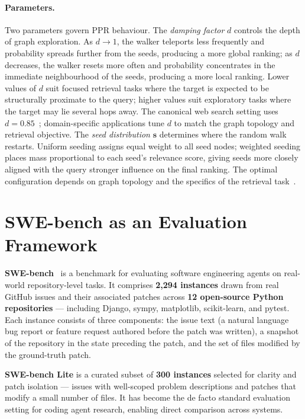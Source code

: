 \paragraph{Parameters.}
Two parameters govern PPR behaviour.
The \emph{damping factor} $d$ controls the depth of graph exploration.
As $d \to 1$, the walker teleports less frequently and probability spreads further from
the seeds, producing a more global ranking; as $d$ decreases, the walker resets more
often and probability concentrates in the immediate neighbourhood of the seeds, producing
a more local ranking.
Lower values of $d$ suit focused retrieval tasks where the target is expected to be
structurally proximate to the query; higher values suit exploratory tasks where the
target may lie several hops away.
The canonical web search setting uses $d = 0.85$~\cite{page1999pagerank}; domain-specific
applications tune $d$ to match the graph topology and retrieval objective.
The \emph{seed distribution} $\mathbf{s}$ determines where the random walk restarts.
Uniform seeding assigns equal weight to all seed nodes; weighted seeding places mass
proportional to each seed's relevance score, giving seeds more closely aligned with
the query stronger influence on the final ranking.
The optimal configuration depends on graph topology and the specifics of the retrieval
task~\cite{haveliwala2002ppr}.

\section{SWE-bench as an Evaluation Framework}
\label{sec:swebench}

\textbf{SWE-bench}~\cite{yang2024swebench} is a benchmark for evaluating software
engineering agents on real-world repository-level tasks.
It comprises \textbf{2{,}294 instances} drawn from real GitHub issues and their
associated patches across \textbf{12 open-source Python repositories} — including
Django, sympy, matplotlib, scikit-learn, and pytest.
Each instance consists of three components: the issue text (a natural language bug
report or feature request authored before the patch was written), a snapshot of the
repository in the state preceding the patch, and the set of files modified by the
ground-truth patch.

\textbf{SWE-bench Lite} is a curated subset of \textbf{300 instances} selected for
clarity and patch isolation — issues with well-scoped problem descriptions and patches
that modify a small number of files.
It has become the de facto standard evaluation setting for coding agent research,
enabling direct comparison across systems.

